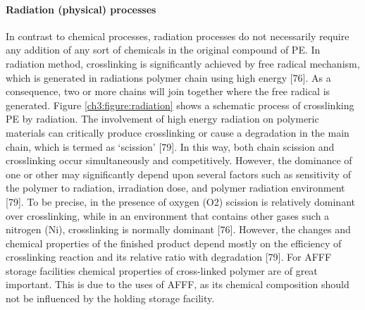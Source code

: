 \documentclass[12pt]{report}
\begin{document}
\paragraph{Radiation (physical) processes}
In contrast to chemical processes, radiation processes do not necessarily require any addition of any sort of chemicals in the original compound of PE. In radiation method, crosslinking is significantly achieved by free radical mechanism, which is generated in radiations polymer chain using high energy [76]. As a consequence, two or more chains will join together where the free radical is generated. Figure \ref{ch3:figure:radiation} shows a schematic process of crosslinking PE by radiation. 
The involvement of high energy radiation on polymeric materials can critically produce crosslinking or cause a degradation in the main chain, which is termed as ‘scission’ [79]. In this way, both chain scission and crosslinking occur simultaneously and competitively. However, the dominance of one or other may significantly depend upon several factors such as sensitivity of the polymer to radiation, irradiation dose, and polymer radiation environment [79]. To be precise, in the presence of oxygen (O2) scission is relatively dominant over crosslinking, while in an environment that contains other gases such a nitrogen (Ni), crosslinking is normally dominant [76]. However, the changes and chemical properties of the finished product depend mostly on the efficiency of crosslinking reaction and its relative ratio with degradation [79]. For AFFF storage facilities chemical properties of cross-linked polymer are of great important. This is due to the uses of AFFF, as its chemical composition should not be influenced by the holding storage facility.  
\end{document}
